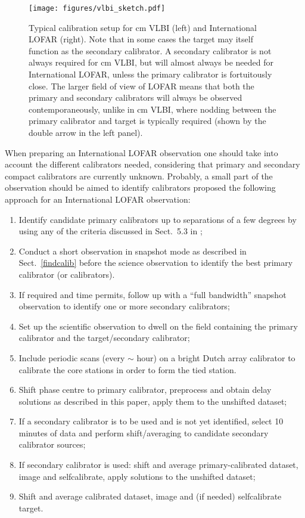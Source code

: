 \documentclass[graybox]{svmult}
\begin{document}
\begin{figure}[] %
\center 
\texttt{[image: figures/vlbi\_sketch.pdf]}
\caption{Typical calibration setup for cm VLBI (left) and International LOFAR
(right).  Note that in some cases the target may itself function as the
secondary calibrator.  A secondary calibrator is not always required for cm
VLBI, but will almost always be needed for International LOFAR, unless the
primary calibrator is fortuitously close.  The larger field of view of LOFAR
means that both the primary and secondary calibrators will always be observed
contemporaneously, unlike in cm VLBI, where nodding between the primary 
calibrator and target is typically required (shown by the double arrow in the
left panel).}
\label{fig:calstrategy}
\end{figure}


When preparing an International LOFAR observation one should take into account
the different calibrators needed, considering that primary and secondary
compact calibrators are currently unknown. Probably, a small part of the
observation should be aimed to identify calibrators \cite{moldon15} proposed
the following approach for an International LOFAR observation: 

\begin{enumerate}
\item Identify candidate primary calibrators up to separations of a few degrees 
    by using any of the criteria discussed in Sect.~5.3 in
    \cite{moldon15};
\item Conduct a short observation in snapshot mode as described
in Sect.~\ref{findcalib} before the science observation to identify
the best primary calibrator (or calibrators).
\item If required and time permits, follow up with a ``full bandwidth'' snapshot observation to 
identify one or more secondary calibrators;
\item Set up the scientific observation to dwell on the field 
containing the primary calibrator and the target/secondary calibrator;
\item Include periodic scans (every $\sim$ hour) on a bright Dutch array 
calibrator to calibrate the core stations in order to form the tied station.
\item Shift phase centre to primary calibrator, preprocess and obtain delay solutions 
as described in this paper, apply them to the unshifted dataset;
\item If a secondary calibrator is to be used and is not yet identified, select 10 minutes
of data and perform shift/averaging to candidate secondary calibrator sources;
\item If secondary calibrator is used: shift and average primary-calibrated dataset, 
image and selfcalibrate, apply solutions to the unshifted dataset;
\item Shift and average calibrated dataset, image and (if needed) selfcalibrate target.
\end{enumerate}
\end{document}
